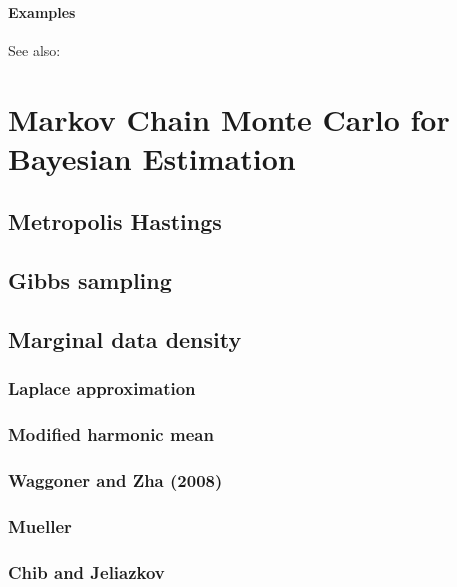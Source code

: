 \documentclass[letterpaper,10pt,english]{sphinxmanual}
\begin{document}
\subsubsection{Examples}
\label{classes/time_series/@ts/ts:id595}
See also:


\chapter{Markov Chain Monte Carlo for Bayesian Estimation}
\label{mcmc::doc}\label{mcmc:markov-chain-monte-carlo-for-bayesian-estimation}

\section{Metropolis Hastings}
\label{mcmc:metropolis-hastings}

\section{Gibbs sampling}
\label{mcmc:gibbs-sampling}

\section{Marginal data density}
\label{mcmc:marginal-data-density}

\subsection{Laplace approximation}
\label{mcmc:laplace-approximation}

\subsection{Modified harmonic mean}
\label{mcmc:modified-harmonic-mean}

\subsection{Waggoner and Zha (2008)}
\label{mcmc:waggoner-and-zha-2008}

\subsection{Mueller}
\label{mcmc:mueller}

\subsection{Chib and Jeliazkov}
\label{mcmc:chib-and-jeliazkov}
\end{document}
